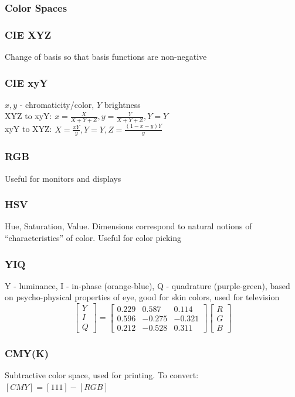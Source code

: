 \documentclass[a4paper,10pt]{article}
\begin{document}
\subsubsection{Color Spaces}
\subsubsection{CIE XYZ} Change of basis so that basis functions are non-negative
\subsubsection{CIE xyY} \( x,y \) - chromaticity/color, \( Y \) brightness\\
XYZ to xyY: \( x = \frac{X}{X+Y+Z}, y = \frac{Y}{X+Y+Z}, Y = Y \) \\
xyY to XYZ: \( X = \frac{xY}{y}, Y = Y, Z = \frac{(1-x-y)Y}{y} \) 
\subsubsection{RGB} Useful for monitors and displays
\subsubsection{HSV} Hue, Saturation, Value. Dimensions correspond to natural notions of ``characteristics'' of color. Useful for color picking
\subsubsection{YIQ} Y - luminance, I - in-phase (orange-blue), Q - quadrature (purple-green), based on psycho-physical properties of eye, good for skin colors, used for television
\[
    \left[\begin{smallmatrix} Y \\ I \\ Q \end{smallmatrix}\right] = \left[\begin{smallmatrix} 0.229 & 0.587 & 0.114 \\ 0.596 & -0.275 & -0.321 \\ 0.212 & -0.528 & 0.311 \end{smallmatrix}\right] \left[\begin{smallmatrix} R \\ G \\ B \end{smallmatrix}\right]
\] 
\subsubsection{CMY(K)} Subtractive color space, used for printing. To convert: \( [CMY] = [111] - [RGB]  \)
\end{document}
